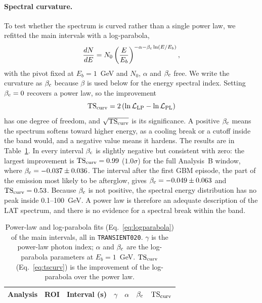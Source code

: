 \paragraph{Spectral curvature.}
To test whether the spectrum is curved rather than a single power law, we refitted the main intervals with a
log-parabola,
\begin{equation}
  \frac{dN}{dE} = N_0 \left(\frac{E}{E_b}\right)^{-\alpha - \beta_{\rm c}\ln(E/E_b)},
  \label{eq:logparabola}
\end{equation}
with the pivot fixed at $E_b = 1$~GeV and $N_0$, $\alpha$ and $\beta_{\rm c}$ free. We write the curvature as
$\beta_{\rm c}$ because $\beta$ is used below for the energy spectral index. Setting $\beta_{\rm c} = 0$ recovers a
power law, so the improvement
\begin{equation}
  {\rm TS}_{\rm curv} = 2\left(\ln\mathcal{L}_{\rm LP} - \ln\mathcal{L}_{\rm PL}\right)
  \label{eq:tscurv}
\end{equation}
has one degree of freedom, and $\sqrt{{\rm TS}_{\rm curv}}$ is its significance. A positive $\beta_{\rm c}$ means the
spectrum softens toward higher energy, as a cooling break or a cutoff inside the band would, and a negative value
means it hardens. The results are in Table~\ref{tab:lat:curv}. In every interval $\beta_{\rm c}$ is slightly
negative but consistent with zero: the largest improvement is ${\rm TS}_{\rm curv} = 0.99$ ($1.0\sigma$) for the
full Analysis~B window, where $\beta_{\rm c} = -0.037 \pm 0.036$. The interval after the first GBM episode, the part
of the emission most likely to be afterglow, gives $\beta_{\rm c} = -0.049 \pm 0.063$ and
${\rm TS}_{\rm curv} = 0.53$. Because $\beta_{\rm c}$ is not positive, the spectral energy distribution has no peak
inside 0.1--100~GeV. A power law is therefore an adequate description of the LAT spectrum, and there is no evidence
for a spectral break within the band.

\begin{table}
  \centering
  \caption{Power-law and log-parabola fits (Eq.~\ref{eq:logparabola}) of the main intervals, all in
  \texttt{TRANSIENT020}. $\gamma$ is the power-law photon index; $\alpha$ and $\beta_{\rm c}$ are the log-parabola
  parameters at $E_b=1$~GeV. ${\rm TS}_{\rm curv}$ (Eq.~\ref{eq:tscurv}) is the improvement of the log-parabola over
  the power law.}
  \label{tab:lat:curv}
  \begin{tabular}{llccccc}
    \hline
    Analysis & ROI & Interval (s) & $\gamma$ & $\alpha$ & $\beta_{\rm c}$ & ${\rm TS}_{\rm curv}$ \\
    \hline
    
  \end{tabular}
\end{table}

